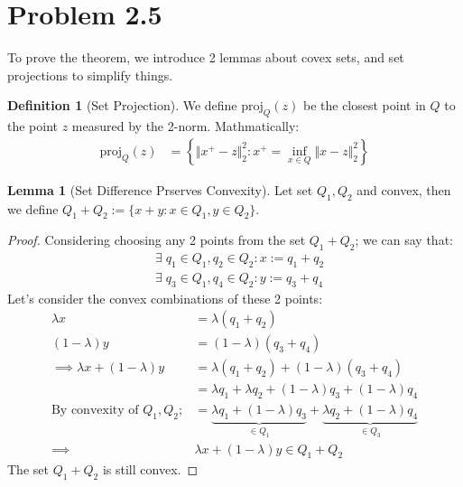 \documentclass[]{article}
\theoremstyle{definition}
\newtheorem{lemma}{Lemma}
\newtheorem{definition}{Definition}
\begin{document}
\section*{Problem 2.5}
    To prove the theorem, we introduce 2 lemmas about covex sets, and set projections to simplify things. 
    \begin{definition}[Set Projection]
        We define $\text{proj}_Q(z)$ be the closest point in $Q$ to the point $z$ measured by the 2-norm. Mathmatically: 
        \begin{align}
            \text{proj}_Q(z) &= 
            \left\lbrace
                \Vert x^+ - z\Vert^2_2: x^+ = \inf_{x\in Q} \Vert x - z\Vert_2^2
            \right\rbrace
        \end{align}
    \end{definition}
    \begin{lemma}[Set Difference Prserves Convexity]
        Let set $Q_1, Q_2$ and convex, then we define $Q_1 + Q_2 := \{x + y: x \in Q_1, y \in Q_2\}$. 
    \end{lemma}
    \begin{proof}
        Considering choosing any 2 points from the set $Q_1 + Q_2$; we can say that: 
        \begin{align}
            & \exists\; q_1 \in Q_1, q_2 \in Q_2 : x := q_1 + q_2
            \\
            & \exists\; q_3 \in Q_1, q_4 \in Q_2 : y := q_3 + q_4
        \end{align}
        Let's consider the convex combinations of these 2 points: 
        \begin{align}
            \lambda x &= \lambda(q_1 + q_2)
            \\
            (1 - \lambda) y &= (1 - \lambda)(q_3 + q_4)
            \\\implies
            \lambda x + (1 - \lambda)y &= 
            \lambda(q_1 + q_2) + (1 - \lambda)(q_3 + q_4)
            \\
            &= 
            \lambda q_1 + \lambda q_2 + (1 - \lambda) q_3 + (1 - \lambda)q_4
            \\
            \text{By convexity of $Q_1, Q_2$}; &= \underbrace{\lambda q_1 + (1 - \lambda) q_3}_{\in Q_1} + 
            \underbrace{\lambda q_2  + (1 - \lambda)q_4}_{\in Q_3}
            \\
            \implies &
            \lambda x + (1 - \lambda)y\in Q_1 + Q_2
        \end{align}
        The set $Q_1 + Q_2$ is still convex. 
    \end{proof}
\end{document}
